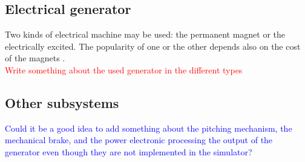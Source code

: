 \subsection{Electrical generator}
Two kinds of electrical machine may be used: the permanent magnet or the electrically excited. The popularity of one or the other depends also on the cost of the magnets \cite{1-s2.0-S0040162519313691-main}. \\
\textcolor{red}{Write something about the used generator in the different types}

\subsection{Other subsystems}
\textcolor{blue}{Could it be a good idea to add something about the pitching mechanism, the mechanical brake, and the power electronic processing the output of the generator even though they are not implemented in the simulator?}




